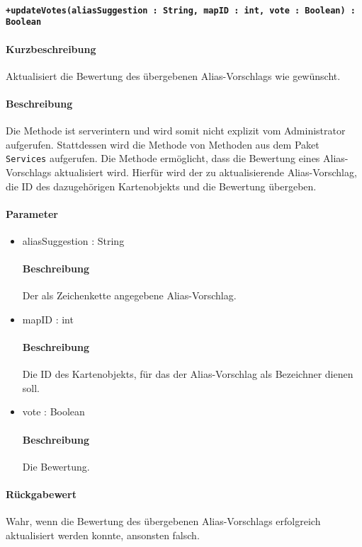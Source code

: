 \paragraph*{\texttt{+updateVotes(aliasSuggestion : String, mapID : int, vote : Boolean) : Boolean}}%
\paragraph*{Kurzbeschreibung}
Aktualisiert die Bewertung des übergebenen Alias-Vorschlags wie gewünscht.
\paragraph*{Beschreibung}
Die Methode ist serverintern und wird somit nicht explizit vom Administrator aufgerufen.
Stattdessen wird die Methode von Methoden aus dem Paket \texttt{Services} aufgerufen.
Die Methode ermöglicht, dass die Bewertung eines Alias-Vorschlags aktualisiert wird.
Hierfür wird der zu aktualisierende Alias-Vorschlag, die ID des dazugehörigen Kartenobjekts und die Bewertung übergeben.
\paragraph*{Parameter}
\begin{itemize}
    \item aliasSuggestion : String
    		\paragraph*{Beschreibung}
    		Der als Zeichenkette angegebene Alias-Vorschlag.
    	\item mapID : int
    		\paragraph*{Beschreibung}
    		Die ID des Kartenobjekts, für das der Alias-Vorschlag als Bezeichner dienen soll.
    	\item vote : Boolean
    		\paragraph*{Beschreibung}
    		Die Bewertung.
\end{itemize}
\paragraph*{Rückgabewert}
Wahr, wenn die Bewertung des übergebenen Alias-Vorschlags erfolgreich aktualisiert werden konnte, ansonsten falsch.
